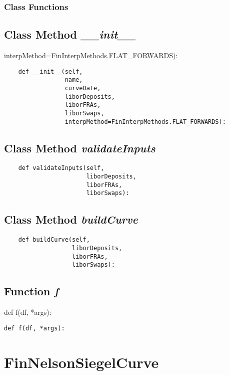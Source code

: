\documentclass[twoside,11pt]{book}
\begin{document}
\subsubsection{Class Functions}

\subsection{Class Method {\it \_\_init\_\_}}
interpMethod=FinInterpMethods.FLAT\_FORWARDS):

\begin{lstlisting}
    def __init__(self,
                 name,
                 curveDate,
                 liborDeposits,
                 liborFRAs,
                 liborSwaps,
                 interpMethod=FinInterpMethods.FLAT_FORWARDS):
\end{lstlisting}

\subsection{Class Method {\it validateInputs}}


\begin{lstlisting}
    def validateInputs(self,
                       liborDeposits,
                       liborFRAs,
                       liborSwaps):
\end{lstlisting}

\subsection{Class Method {\it buildCurve}}


\begin{lstlisting}
    def buildCurve(self,
                   liborDeposits,
                   liborFRAs,
                   liborSwaps):
\end{lstlisting}

\subsection{Function {\it f}}
def f(df, *args):

\begin{lstlisting}
def f(df, *args):
\end{lstlisting}

\newpage
\section{FinNelsonSiegelCurve}
\end{document}
